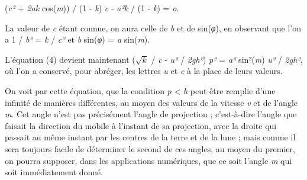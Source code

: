 \documentclass[a4paper, 11pt, oneside, polutonikogreek, french]{article}
\begin{document}
\begin{center}
(\emph{c²} + \emph{2ak} cos(\emph{m})) / (1 - \emph{k}) \emph{c} - \emph{a²k} / (1 - \emph{k}) = \emph{o}.
\end{center}

La valeur de \emph{c} étant connue, on aura celle de \emph{b} et de sin(\emph{φ}), en observant que l'on a 1 / \emph{b²} = \emph{k} / \emph{c²} et \emph{b} sin(\emph{φ}) = \emph{a} sin(\emph{m}).

L'équation (4) devient maintenant ($\sqrt{k}$ / \emph{c} - \emph{u²} / \emph{2gh²}) \emph{p²} = \emph{a²} sin²(\emph{m}) \emph{u²} / \emph{2gh²}, où l'on a conservé, pour abréger, les lettres \emph{u} et \emph{c} à la place de leurs valeurs.

On voit par cette équation, que la condition \emph{p} < \emph{h} peut être remplie d'une infinité de manières différentes, au moyen des valeurs de la vitesse \emph{v} et de l'angle \emph{m}. Cet angle n'est pas précisément l'angle de projection ; c'est-à-dire l'angle que faisait la direction du mobile à l'instant de sa projection, avec la droite qui passait au même instant par les centres de la terre et de la lune ; mais comme il sera toujours facile de déterminer le second de ces angles, au moyen du premier, on pourra supposer, dans les applications numériques, que ce soit l'angle \emph{m} qui soit immédiatement donné.
\end{document}
